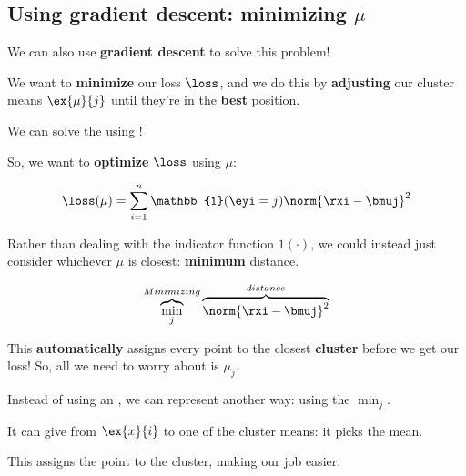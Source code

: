     \subsection*{Using gradient descent: minimizing $\mu$}
    
        We can also use \textbf{gradient descent} to solve this problem!
        
        We want to \textbf{minimize} our loss $\loss$, and we do this by \textbf{adjusting} our cluster means $\ex{\mu}{j}$ until they're in the \textbf{best} position.\\
        
        \begin{concept}
            We can solve the  using !
        \end{concept}
        
        So, we want to \textbf{optimize} $\loss$ using $\mu$:
        
        \begin{equation}
            \loss(\mu) =
            \sum_{i=1}^n 
                    \mathbb{1}(\eyi = j)
                    \norm{ \rxi - \bmuj }^2 
        \end{equation}
        
        Rather than dealing with the indicator function $1(\cdot)$, we could instead just consider whichever $\mu$ is closest: \textbf{minimum} distance.
        
        \begin{equation}
            \overbrace{
                \min_{j} 
            }^{Minimizing}
            \overbrace{
                \norm{ \rxi - \bmuj }^2 
            }^{distance}
        \end{equation}
        
        This \textbf{automatically} assigns every point to the closest \textbf{cluster} before we get our loss! So, all we need to worry about is $\mu_j$.
        
        \begin{notation}
            Instead of using an , we can represent  another way: using the  $\min_{j}$.
            
            It can give  from $\ex{x}{i}$ to one of the cluster means: it picks the  mean. 
            
            This  assigns the point to the  cluster, making our job easier.
        \end{notation}
        
